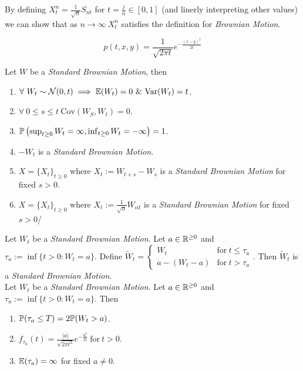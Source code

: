 \documentclass[11pt,a4paper]{article}
\begin{document}
By defining $X_t^n=\frac{1}{\sqrt{n}}S_{nt}$ for $t=\frac{j}{n}\in[0,1]$ (and linerly interpreting other values) we can show that as $n\to\infty\ X_t^n$ satisfies the definition for \textit{Brownian Motion}.

$$p(t,x,y)=\frac{1}{\sqrt{2\pi t}}e^{-\frac{(x-y)^2}{2t}}$$

Let $W$ be a \textit{Standard Brownian Motion}, then
\begin{enumerate}
	\item $\forall\ W_t\sim\mathcal{N}(0,t)\implies\expect(W_t)=0\ \&\ \mathrm{Var}(W_t)=t$.
	\item $\forall\ 0\leq s\leq t\ \mathrm{Cov}(W_S,W_t)=0$.
	\item $\mathbb{P}\left(\sup_{t\geq0}W_t=\infty,\inf_{t\geq0}W_t=-\infty\right)=1$.
	\item $-W_t$ is a \textit{Standard Brownian Motion}.
	\item $X=\{X_t\}_{t\geq0}$ where $X_t:=W_{t+s}-W_{s}$ is a \textit{Standard Brownian Motion} for fixed $s>0$.
	\item $X=\{X_t\}_{t\geq0}$ where $X_t:=\frac{1}{\sqrt{\alpha}}W_{\alpha t}$ is a \textit{Standard Brownian Motion} for fixed $s>0$/
\end{enumerate}

Let $W_t$ be a \textit{Standard Brownian Motion}. Let $a\in\mathbb{R}^{\geq0}$ and $\tau_a:=\inf\{t>0:W_t=a\}$. Define $\widetilde{W}_t=\begin{cases}W_t&\mathrm{for\ }t\leq\tau_a\\a-(W_t-a)&\mathrm{for\ }t>\tau_a\end{cases}$. Then $\widetilde{W}_t$ is a \textit{Standard Brownian Motion}.\\

Let $W_t$ be a \textit{Standard Brownian Motion}. Let $a\in\mathbb{R}^{\geq0}$ and $\tau_a:=\inf\{t>0:W_t=a\}$. Then
\begin{enumerate}
	\item $\mathbb{P}(\tau_a\leq T)=2\mathbb{P}(W_t>a)$.
	\item $f_{\tau_a}(t)=\frac{|a|}{\sqrt{2\pi t^3}}e^{-\frac{a^2}{2t}}\ \mathrm{for}\ t>0$.
	\item $\mathbb{E}(\tau_a)=\infty$ for fixed $a\neq0$.
\end{enumerate}
\end{document}
